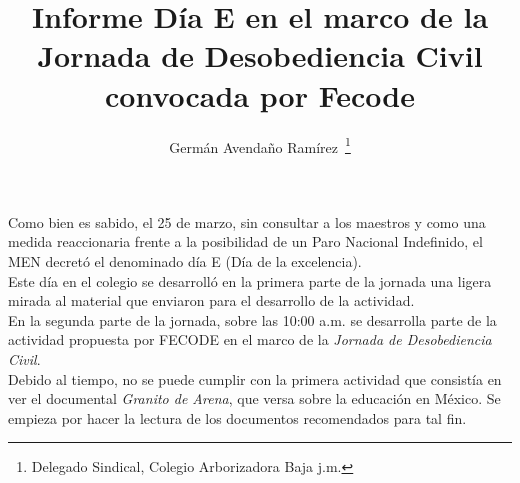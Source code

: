 \documentclass[10pt,letterpaper]{article}
\author{Germán Avendaño Ramírez~\thanks{Delegado Sindical, Colegio Arborizadora Baja j.m.}}
\title{Informe Día E en el marco de la Jornada de Desobediencia Civil convocada por Fecode}
\begin{document}
\maketitle
Como bien es sabido, el 25 de marzo, sin consultar a los maestros y como una medida reaccionaria frente a la posibilidad de un Paro Nacional Indefinido, el MEN decretó el denominado día E (Día de la excelencia).\\

Este día en el colegio se desarrolló en la primera parte de la jornada una ligera mirada al material que enviaron para el desarrollo de la actividad.\\

En la segunda parte de la jornada, sobre las 10:00 a.m. se desarrolla parte de la actividad propuesta por FECODE en el marco de la \emph{Jornada de Desobediencia Civil}.\\

Debido al tiempo, no se puede cumplir con la primera actividad que consistía en ver el documental \emph{Granito de Arena}, que versa sobre la educación en México. Se empieza por hacer la lectura de los documentos recomendados para tal fin.\\
\end{document}
